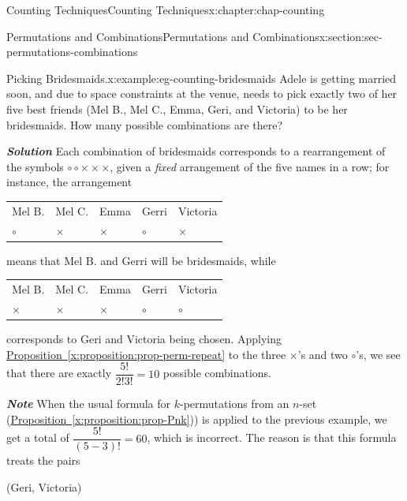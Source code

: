 \documentclass[oneside,10pt,]{book}
\newcommand{\tabularfont}{\relax}
\newcommand{\xreffont}{\relax}
\newcommand{\alert}[1]{\textbf{\textit{#1}}}
\numberwithin{equation}{section}
\begin{document}
\begin{chapterptx}{Counting Techniques}{}{Counting Techniques}{}{}{x:chapter:chap-counting}
\begin{sectionptx}{Permutations and Combinations}{}{Permutations and Combinations}{}{}{x:section:sec-permutations-combinations}
\begin{example}{Picking Bridesmaids.}{x:example:eg-counting-bridesmaids}
Adele is getting married soon, and due to space constraints at the venue, needs to pick exactly two of her five best friends (Mel B., Mel C., Emma, Geri, and Victoria) to be her bridesmaids. How many possible combinations are there?%
\par
\alert{Solution} Each combination of bridesmaids corresponds to a rearrangement of the symbols \(\circ \circ \times \times \times\), given a \emph{fixed} arrangement of the five names in a row; for instance, the arrangement%
\begin{sidebyside}{1}{0.225}{0.225}{0}%
\begin{sbspanel}{0.55}%
{\centering%
{\tabularfont%
\begin{tabular}{lllll}
Mel B.&Mel C.&Emma&Gerri&Victoria\tabularnewline[0pt]
\(\circ\)&\(\times\)&\(\times\)&\(\circ\)&\(\times\)
\end{tabular}
}%
\par}
\end{sbspanel}%
\end{sidebyside}%
\par
means that Mel B. and Gerri will be bridesmaids, while%
\begin{sidebyside}{1}{0.225}{0.225}{0}%
\begin{sbspanel}{0.55}%
{\centering%
{\tabularfont%
\begin{tabular}{lllll}
Mel B.&Mel C.&Emma&Gerri&Victoria\tabularnewline[0pt]
\(\times\)&\(\times\)&\(\times\)&\(\circ\)&\(\circ\)
\end{tabular}
}%
\par}
\end{sbspanel}%
\end{sidebyside}%
\par
corresponds to Geri and Victoria being chosen. Applying \hyperref[x:proposition:prop-perm-repeat]{Proposition~{\xreffont\ref{x:proposition:prop-perm-repeat}}} to the three \(\times\)'s and two \(\circ\)'s, we see that there are exactly \(\dfrac{5!}{2! 3!} = 10\) possible combinations.%
\par
\alert{Note} When the usual formula for \(k\)-permutations from an \(n\)-set (\hyperref[x:proposition:prop-Pnk]{Proposition~{\xreffont\ref{x:proposition:prop-Pnk}}})) is applied to the previous example, we get a total of \(\dfrac{5!}{(5-3)!} = 60\), which is incorrect. The reason is that this formula treats the pairs%
\begin{sidebyside}{3}{0.2}{0.2}{0}%
\begin{sbspanel}{0.25}%
(Geri, Victoria)%
\end{sbspanel}%

\end{sidebyside}
\end{example}
\end{sectionptx}
\end{chapterptx}
\end{document}
